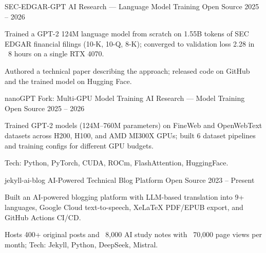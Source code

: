 
\begin{cventries}

  \cventry
    {SEC-EDGAR-GPT} %
    {AI Research --- Language Model Training} %
    {Open Source} %
    {2025 -- 2026} %
    {
      \begin{cvitems}
        \item {Trained a GPT-2 124M language model from scratch on 1.55B tokens of SEC EDGAR financial filings (10-K, 10-Q, 8-K); converged to validation loss 2.28 in ~8 hours on a single RTX 4070.}
        \item {Authored a technical paper describing the approach; released code on GitHub and the trained model on Hugging Face.}
      \end{cvitems}
    }

  \cventry
    {nanoGPT Fork: Multi-GPU Model Training} %
    {AI Research --- Model Training} %
    {Open Source} %
    {2025 -- 2026} %
    {
      \begin{cvitems}
        \item {Trained GPT-2 models (124M--760M parameters) on FineWeb and OpenWebText datasets across H200, H100, and AMD MI300X GPUs; built 6 dataset pipelines and training configs for different GPU budgets.}
        \item {Tech: Python, PyTorch, CUDA, ROCm, FlashAttention, HuggingFace.}
      \end{cvitems}
    }

  \cventry
    {jekyll-ai-blog} %
    {AI-Powered Technical Blog Platform} %
    {Open Source} %
    {2023 -- Present} %
    {
      \begin{cvitems}
        \item {Built an AI-powered blogging platform with LLM-based translation into 9+ languages, Google Cloud text-to-speech, XeLaTeX PDF/EPUB export, and GitHub Actions CI/CD.}
        \item {Hosts 400+ original posts and ~8,000 AI study notes with ~70,000 page views per month; Tech: Jekyll, Python, DeepSeek, Mistral.}
      \end{cvitems}
    }


\end{cventries}
